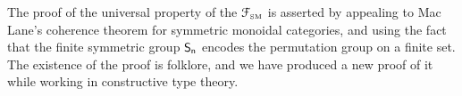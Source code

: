 The proof of the universal property of the $\FSM$ is asserted by appealing to Mac Lane's coherence theorem for symmetric
monoidal categories, and using the fact that the finite symmetric group $\Sn$ encodes the permutation group on a finite
set. The existence of the proof is folklore, and we have produced a new proof of it while working in constructive type
theory.



